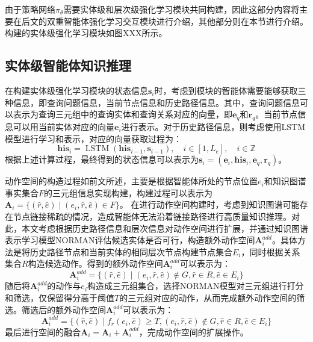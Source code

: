 \documentclass[algorithmlist, AutoFakeBold, AutoFakeSlant, figurelist, tablelist, nomlist, masters]{seuthesix}
\begin{document}
由于策略网络$\pi_\theta$需要实体级和层次级强化学习模块共同构建，因此这部分内容将主要在后文的双重智能体强化学习交互模块进行介绍，其他部分则在本节进行介绍。构建的实体级强化学习模块如图XXX所示。

\subsection{实体级智能体知识推理}
在构建实体级强化学习模块的状态信息$\bm{s}_i$时，考虑到模块的智能体需要能够获取三种信息，即查询问题信息，当前节点信息和历史路径信息。其中，查询问题信息可以表示为查询三元组中的查询实体和查询关系对应的向量，即$\bm{e}_q$和$\bm{r}_q$。当前节点信息可以用当前实体对应的向量$\bm{e}_i$进行表示。对于历史路径信息，则考虑使用LSTM模型进行学习和表示，对应的向量获取过程为：
\begin{equation}
  \bm{his}_i=\operatorname{LSTM}\left(\bm{his}_{i - 1}, \bm{s}_{i - 1}\right),\quad i \in [1, L_e], \quad i \in \mathbb{Z}
  \label{equation_HistoryLSTM}
\end{equation}
根据上述计算过程，最终得到的状态信息可以表示为$\bm{s}_i = (\bm{e}_i, \bm{his}_i, \bm{e}_q, \bm{r}_q)$。

动作空间的构造过程如前文所述，主要是根据智能体所处的节点位置$e_i$和知识图谱事实集合$F$的三元组信息实现构建，构建过程可以表示为$\bm{A}_i = \{(\hat{r}, \hat{e}) \mid (e_i, \hat{r}, \hat{e}) \in F\}$。
在进行动作空间构建时，考虑到知识图谱可能存在节点链接稀疏的情况，造成智能体无法沿着链接路径进行高质量知识推理。对此，本文考虑根据历史路径信息和层次信息对动作空间进行扩展，并通过知识图谱表示学习模型NORMAN评估候选实体是否可行，构造额外动作空间$\bm{A}_{i}^{add}$。具体方法是将历史路径节点和当前实体的相同层次节点构建节点集合$E_i$，同时根据关系集合$R$构造候选动作。得到的额外动作空间$\bm{A}_{i}^{add}$可以表示为：
\begin{equation}
  \bm{A}_{i}^{add} = \{(\hat{r}, \hat{e}) \mid (e_i, \hat{r}, \hat{e}) \notin G, \hat{r} \in R, \hat{e} \in E_i \}
\end{equation}
随后将$\bm{A}_{i}^{add}$的动作与$e_i$构造成三元组集合，选择NORMAN模型对三元组进行打分和筛选，仅保留得分高于阈值$T$的三元组对应的动作，从而完成额外动作空间的筛选。筛选后的额外动作空间$\bm{A}_{i}^{add}$可以表示为：
\begin{equation}
  \bm{A}_i^{add} = \{(\hat{r}, \hat{e}) \mid f_{\hat{r}}(e_i, \hat{e}) \geq T, (e_i, \hat{r}, \hat{e}) \notin G, \hat{r} \in R, \hat{e} \in E_i \}
\end{equation}
最后进行空间的融合$\bm{A}_i = \bm{A}_i + \bm{A}_{i}^{add} $，完成动作空间的扩展操作。
\end{document}
